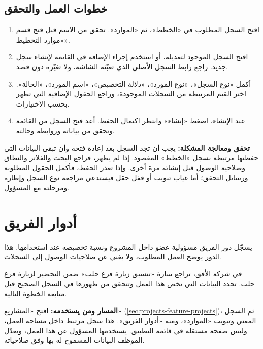 \subsection{خطوات العمل والتحقق}
\begin{enumerate}
\item افتح السجل المطلوب في «الخطط»، ثم «الموارد». تحقق من الاسم قبل فتح قسم «موارد التخطيط».
\item افتح السجل الموجود لتعديله، أو استخدم إجراء الإضافة في القائمة لإنشاء سجل جديد. راجع رابط السجل الأصلي الذي تعبّئه الشاشة، ولا تغيّره دون قصد.
\item أكمل «نوع السجل»، «نوع المورد»، «دلالة التخصيص»، «اسم المورد»، «الحالة». اختر القيم المرتبطة من السجلات الموجودة، وراجع الحقول الإضافية التي تظهر بحسب الاختيارات.
\item عند الإنشاء، اضغط «إنشاء» وانتظر اكتمال الحفظ. أعد فتح السجل من القائمة وتحقق من بياناته وروابطه وحالته.
\end{enumerate}

\textbf{تحقق ومعالجة المشكلة:} يجب أن تجد السجل بعد إعادة فتحه وأن تبقى البيانات التي حفظتها مرتبطة بسجل «الخطط» المقصود. إذا لم يظهر، فراجع البحث والفلاتر والنطاق وصلاحية الوصول قبل إنشائه مرة أخرى. وإذا تعذر الحفظ، فأكمل الحقول المطلوبة ورسائل التحقق؛ أما غياب تبويب أو قفل حقل فيستدعي مراجعة نوع السجل وإطاره ومرحلته مع المسؤول.

\clearpage
\section{أدوار الفريق}
\label{sec:projects-feature-team-roles}

يسجّل دور الفريق مسؤولية عضو داخل المشروع ونسبة تخصيصه عند استخدامها. هذا الدور يوضح العمل المطلوب، ولا يغني عن صلاحيات الوصول إلى السجلات.

\begin{rcnote}
في شركة الأفق، تراجع سارة «تنسيق زيارة فرع حلب» ضمن التحضير لزيارة فرع حلب. تحدد البيانات التي تخص هذا العمل وتتحقق من ظهورها في السجل الصحيح قبل متابعة الخطوة التالية.
\end{rcnote}

\textbf{المسار ومن يستخدمه:} افتح «المشاريع» (\ref{sec:projects-feature-projects})، ثم السجل المعني وتبويب «الموارد»، ومنه «أدوار الفريق». هذا سجل مرتبط داخل مساحة العمل، وليس صفحة مستقلة في قائمة التطبيق. يستخدمها المسؤول عن هذا العمل، ويعدّل الموظف البيانات المسموح له بها وفق صلاحياته.

